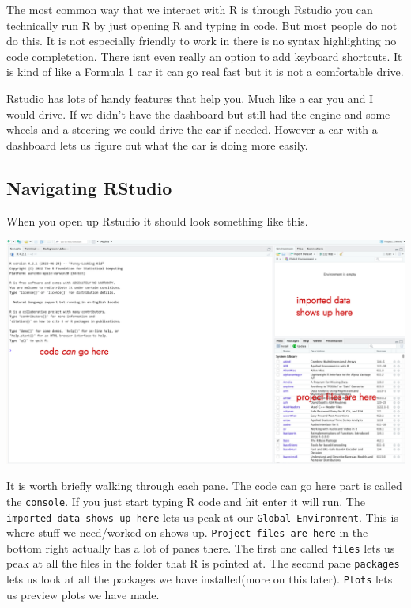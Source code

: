 \documentclass[
  letterpaper,
  DIV=11,
  numbers=noendperiod,
  oneside]{scrreprt}
\begin{document}
The most common way that we interact with R is through Rstudio you can
technically run R by just opening R and typing in code. But most people
do not do this. It is not especially friendly to work in there is no
syntax highlighting no code completetion. There isnt even really an
option to add keyboard shortcuts. It is kind of like a Formula 1 car it
can go real fast but it is not a comfortable drive.

Rstudio has lots of handy features that help you. Much like a car you
and I would drive. If we didn't have the dashboard but still had the
engine and some wheels and a steering we could drive the car if needed.
However a car with a dashboard lets us figure out what the car is doing
more easily.

\hypertarget{navigating-rstudio-1}{%
\subsection{Navigating RStudio}\label{navigating-rstudio-1}}

When you open up Rstudio it should look something like this.

\includegraphics[width=8.22in,height=\textheight]{figs/annotated-rstudio.png}

It is worth briefly walking through each pane. The code can go here part
is called the \texttt{console}. If you just start typing R code and hit
enter it will run. The \texttt{imported\ data\ shows\ up\ here} lets us
peak at our \texttt{Global\ Environment}. This is where stuff we
need/worked on shows up. \texttt{Project\ files\ are\ here} in the
bottom right actually has a lot of panes there. The first one called
\texttt{files} lets us peak at all the files in the folder that R is
pointed at. The second pane \texttt{packages} lets us look at all the
packages we have installed(more on this later). \texttt{Plots} lets us
preview plots we have made.
\end{document}
